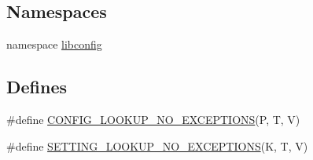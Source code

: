 \subsection*{Namespaces}
\begin{DoxyCompactItemize}
\item 
namespace \hyperlink{namespacelibconfig}{libconfig}
\end{DoxyCompactItemize}
\subsection*{Defines}
\begin{DoxyCompactItemize}
\item 
\#define \hyperlink{libconfigcpp_8c_09_09_aac782925c90a12a08457aa1e9eec31bd}{CONFIG\_\-LOOKUP\_\-NO\_\-EXCEPTIONS}(P, T, V)
\item 
\#define \hyperlink{libconfigcpp_8c_09_09_abfd54db12d50ab5a5811407b035c743b}{SETTING\_\-LOOKUP\_\-NO\_\-EXCEPTIONS}(K, T, V)
\end{DoxyCompactItemize}



